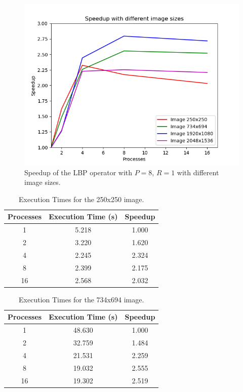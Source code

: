 \documentclass[10pt,twocolumn,letterpaper]{article}
\begin{document}
\begin{figure}[H]
	\includegraphics[width=\linewidth]{images/speedup_by_img_sizes.png}
	\caption{Speedup of the LBP operator with $P=8$, $R=1$ with different image sizes.}
	\label{fig:speedup_img}
\end{figure}

\begin{table}[H]
	\begin{center}
		\begin{tabular}{|c|c|c|}
			\hline
			Processes & Execution Time (s) & Speedup \\
			\hline
			1 & 5.218 & 1.000 \\
			2 & 3.220 & 1.620 \\
			4 & 2.245 & 2.324 \\
			8 & 2.399 & 2.175 \\
			16 & 2.568 & 2.032 \\
			\hline
		\end{tabular}
	\end{center}
	\caption{Execution Times for the 250x250 image.}
	\label{tab:speedup_k_i_1}
\end{table}

\begin{table}[H]
	\begin{center}
		\begin{tabular}{|c|c|c|}
			\hline
			Processes & Execution Time (s) & Speedup \\
			\hline
			1 & 48.630 & 1.000 \\
			2 & 32.759 & 1.484 \\
			4 & 21.531 & 2.259 \\
			8 & 19.032 & 2.555 \\
			16 & 19.302 & 2.519 \\
			\hline
		\end{tabular}
	\end{center}
	\caption{Execution Times for the 734x694 image.}
	\label{tab:speedup_k_i_2}
\end{table}
\end{document}
